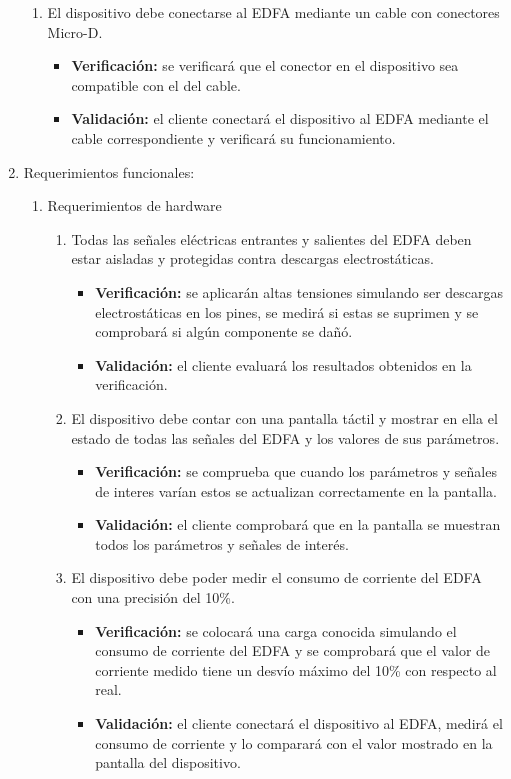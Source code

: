 \documentclass[
11pt, %
codirector, %
]{charter}
\begin{document}
\begin{enumerate}
\begin{enumerate}
\item El dispositivo debe conectarse al EDFA mediante un cable con conectores Micro-D.
\begin{itemize}
	\item \textbf{Verificación:} se verificará que el conector en el dispositivo sea compatible con el del cable.
	\item \textbf{Validación:} el cliente conectará el dispositivo al EDFA mediante el cable correspondiente y verificará su funcionamiento.
\end{itemize}
\end{enumerate}

\item Requerimientos funcionales:
\begin{enumerate}
\item Requerimientos de hardware
\begin{enumerate}[label*=\arabic*.]
\item Todas las señales eléctricas entrantes y salientes del EDFA deben estar aisladas y protegidas contra descargas electrostáticas.
\begin{itemize}
	\item \textbf{Verificación:} se aplicarán altas tensiones simulando ser descargas electrostáticas en los pines, se medirá si estas se suprimen y se comprobará si algún componente se dañó.
	\item \textbf{Validación:} el cliente evaluará los resultados obtenidos en la verificación.
\end{itemize}

\item El dispositivo debe contar con una pantalla táctil y mostrar en ella el estado de todas las señales del EDFA y los valores de sus parámetros.
\begin{itemize}
	\item \textbf{Verificación:} se comprueba que cuando los parámetros y señales de interes varían estos se actualizan correctamente en la pantalla.
	\item \textbf{Validación:} el cliente comprobará que en la pantalla se muestran todos los parámetros y señales de interés.
\end{itemize}

\item El dispositivo debe poder medir el consumo de corriente del EDFA con una precisión del 10\%.
\begin{itemize}
	\item \textbf{Verificación:} se colocará una carga conocida simulando el consumo de corriente del EDFA y se comprobará que el valor de corriente medido tiene un desvío máximo del 10\% con respecto al real.
	\item \textbf{Validación:} el cliente conectará el dispositivo al EDFA, medirá el consumo de corriente y lo comparará con el valor mostrado en la pantalla del dispositivo.
\end{itemize}


\end{enumerate}
\end{enumerate}
\end{enumerate}
\end{document}
